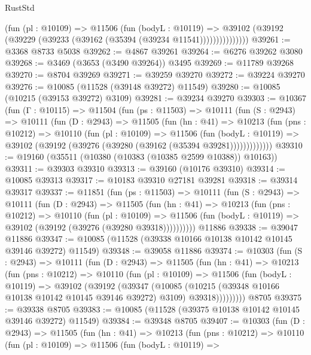 \begin{lexlean}{RustStd}
\begin{coremodule}
                  (fun (pl : @10109) =>
                  @11506
                    (fun (bodyL : @10119) =>
                    @39102 (@39192 (@39229 (@39233 (@39162 (@35394 (@39234 @11541)))))))))))))))
@39261 := @3368 @8733 @5038
@39262 := @4867 @39261
@39264 := @6276 @39262 @3080
@39268 := @3469 (@3653 (@3490 @39264)) @3495
@39269 := @11789 @39268
@39270 := @8704 @39269
@39271 := @39259 @39270
@39272 := @39224 @39270
@39276 := @10085 (@11528 (@39148 @39272) @11549)
@39280 := @10085 (@10215 (@39153 @39272) @3109)
@39281 := @39234 @39270
@39303 := @10367
    (fun (Γ : @10115) =>
    @11504
      (fun (ps : @11503) =>
      @10111
        (fun (S : @2943) =>
        @10111
          (fun (D : @2943) =>
          @11505
            (fun (hn : @41) =>
            @10213
              (fun (pns : @10212) =>
              @10110
                (fun (pl : @10109) =>
                @11506
                  (fun (bodyL : @10119) =>
                  @39102 (@39192 (@39276 (@39280 (@39162 (@35394 @39281)))))))))))))
@39310 := @19160 (@35511 (@10380 (@10383 (@10385 @2599 @10388)) @10163))
@39311 := @39303 @39310
@39313 := @39160 (@10176 @39310)
@39314 := @10085 @39313
@39317 := @10183 @39310 @27181 @39281
@39318 := @39314 @39317
@39337 := @11851
    (fun (ps : @11503) =>
    @10111
      (fun (S : @2943) =>
      @10111
        (fun (D : @2943) =>
        @11505
          (fun (hn : @41) =>
          @10213
            (fun (pns : @10212) =>
            @10110
              (fun (pl : @10109) =>
              @11506 (fun (bodyL : @10119) => @39102 (@39192 (@39276 (@39280 @39318))))))))))
    @11886
@39338 := @39047 @11886
@39347 := @10085 (@11528 (@39338 @10166 @10138 @10142 @10145 @39146 @39272) @11549)
@39348 := @39058 @11886
@39374 := @10303
    (fun (S : @2943) =>
    @10111
      (fun (D : @2943) =>
      @11505
        (fun (hn : @41) =>
        @10213
          (fun (pns : @10212) =>
          @10110
            (fun (pl : @10109) =>
            @11506
              (fun (bodyL : @10119) =>
              @39102
                (@39192
                  (@39347
                    (@10085
                      (@10215 (@39348 @10166 @10138 @10142 @10145 @39146 @39272) @3109)
                      @39318)))))))))
    @8705
@39375 := @39338 @8705
@39383 := @10085 (@11528 (@39375 @10138 @10142 @10145 @39146 @39272) @11549)
@39384 := @39348 @8705
@39407 := @10303
    (fun (D : @2943) =>
    @11505
      (fun (hn : @41) =>
      @10213
        (fun (pns : @10212) =>
        @10110
          (fun (pl : @10109) =>
          @11506
            (fun (bodyL : @10119) =>

\end{coremodule}
\end{lexlean}
